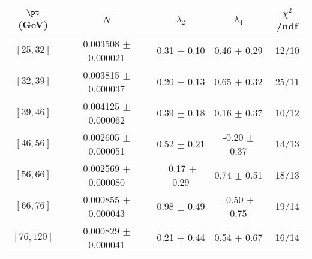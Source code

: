 \begin{tabular}{c||c|c|c|c}
$\pt$ (GeV) & $N$ & $\lambda_{2}$ & $\lambda_4$  & $\chi^2$/ndf  \\
\hline
$[25, 32]$ & 0.003508 $\pm$ 0.000021 & 0.31 $\pm$ 0.10 & 0.46 $\pm$ 0.29 & 12/10\\
$[32, 39]$ & 0.003815 $\pm$ 0.000037 & 0.20 $\pm$ 0.13 & 0.65 $\pm$ 0.32 & 25/11\\
$[39, 46]$ & 0.004125 $\pm$ 0.000062 & 0.39 $\pm$ 0.18 & 0.16 $\pm$ 0.37 & 10/12\\
$[46, 56]$ & 0.002605 $\pm$ 0.000051 & 0.52 $\pm$ 0.21 & -0.20 $\pm$ 0.37 & 14/13\\
$[56, 66]$ & 0.002569 $\pm$ 0.000080 & -0.17 $\pm$ 0.29 & 0.74 $\pm$ 0.51 & 18/13\\
$[66, 76]$ & 0.000855 $\pm$ 0.000043 & 0.98 $\pm$ 0.49 & -0.50 $\pm$ 0.75 & 19/14\\
$[76, 120]$ & 0.000829 $\pm$ 0.000041 & 0.21 $\pm$ 0.44 & 0.54 $\pm$ 0.67 & 16/14\\
\end{tabular}

